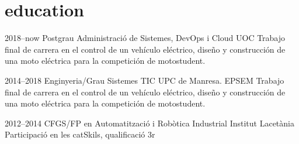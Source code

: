 \documentclass[]{cv-style}          %
\begin{document}

\section{education}

\begin{entrylist}
\entry
{2018--now}
{Postgrau {\normalfont Administració de Sistemes, DevOps i Cloud}}
{UOC}
{Trabajo final de carrera en el control de un vehículo eléctrico, diseño y construcción de una moto eléctrica para la competición de motostudent.}


\entry
{2014--2018}
{Enginyeria/Grau {\normalfont Sistemes TIC}}
{UPC de Manresa. EPSEM}
{Trabajo final de carrera en el control de un vehículo eléctrico, diseño y construcción de una moto eléctrica para la competición de motostudent.}

\entry
{2012--2014}
{CFGS/FP {\normalfont en Automatització i Robòtica Industrial}}
{Institut Lacetània}
{Participació en les catSkils, qualificació 3r}

\end{entrylist}



\end{document}
